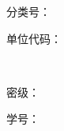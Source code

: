 \begin{center}
\vfill
\noindent
\parbox{0.45\textwidth}{\fontsize{12pt}{16pt}\selectfont
  分类号：\underline{\makebox[2cm][c]{\@classification}}%
}
\hfill
\parbox{0.45\textwidth}{\fontsize{12pt}{16pt}\selectfont
  单位代码：\underline{}%
}\\[4pt]

\noindent
\parbox{0.45\textwidth}{\fontsize{12pt}{16pt}\selectfont
  密\phantom{XX}级：\underline{\makebox[2cm][c]{\@security}}%
}
\hfill
\parbox{0.45\textwidth}{\fontsize{12pt}{16pt}\selectfont
  学\phantom{XX}号：\underline{\makebox[2cm][c]{\@studentid}}%
}

\end{center}

\clearpage
